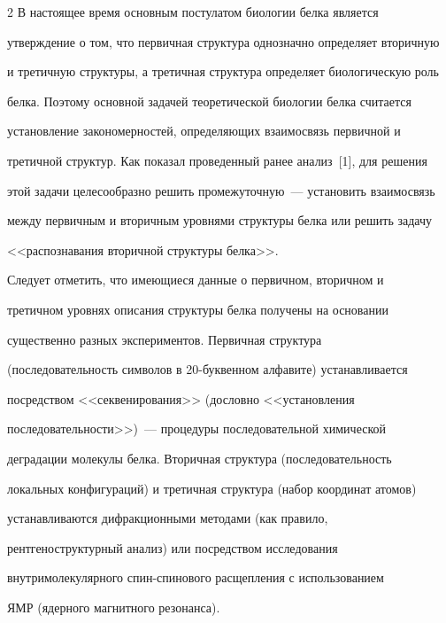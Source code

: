 \begin{multicols}{2}
    В настоящее время основным постулатом биологии белка является 

утверждение о том, что первичная структура однозначно определяет вторичную 

и третичную структуры, а третичная структура определяет биологическую роль 

белка. Поэтому основной задачей теоретической биологии белка считается 

установление закономерностей, определяющих взаимосвязь первичной и 

третичной структур. Как показал проведенный ранее анализ~[1], для решения 

этой задачи целесообразно решить промежуточную~--- установить взаимосвязь 

между первичным и вторичным уровнями структуры белка или решить задачу 

<<распознавания вторичной структуры белка>>. 



    Следует отметить, что имеющиеся данные о первич\-ном, вторичном и 

третичном уровнях описания структуры белка получены на основании 

существенно  разных экспериментов. Первичная структура 

(последовательность символов в 20-бук\-вен\-ном алфавите) устанавливается 

посредством <<секвенирования>> (дословно <<установления 

последова\-тельности>>)~--- процедуры последовательной хи\-мической 

деградации  молекулы белка. Вторичная структура (последовательность 

локальных конфигураций) и третичная структура (набор координат атомов) 

устанавливаются дифракционными методами (как правило, 

рентгеноструктурный анализ) или посредством исследования 

внутримолекулярного спин-спи\-но\-во\-го расщепления с использованием 

ЯМР (ядерного магнитного резо\-нанса).  



\begin{figure} %

\vspace*{1pt}

\begin{center}


\end{center}
\end{figure}
\end{multicols}
